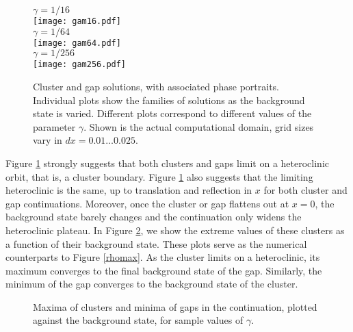 \documentclass[10pt]{article}
\begin{document}
\begin{figure}[h!]\begin{center}
$\gamma = 1/16$\\ 
\texttt{[image: gam16.pdf]}\\
$\gamma= 1/64$\\
\texttt{[image: gam64.pdf]}\\
$\gamma =1/256$\\
\texttt{[image: gam256.pdf]}\\
\end{center}
\caption{Cluster and gap solutions, with associated phase portraits. Individual plots show the families of solutions as the background state is varied. Different plots correspond to different values of the parameter $\gamma$. Shown is the actual computational domain, grid sizes vary in $dx=0.01\ldots 0.025$. }
\label{hom_conts}
\end{figure}

Figure \ref{hom_conts} strongly suggests that both clusters and gaps limit on a heteroclinic orbit, that is, a cluster boundary.  Figure \ref{hom_conts} also suggests that the limiting heteroclinic is the same, up to translation and reflection in $x$ for both cluster and gap continuations.   Moreover, once the cluster or gap flattens out at $x=0$, the background state barely changes and the continuation only widens the heteroclinic plateau.   In Figure  \ref{ext_v_bgst}, we show the extreme values of these clusters as a function of their background state.  These plots serve as the numerical counterparts to Figure \ref{rhomax}.  As the cluster limits on a heteroclinic, its maximum converges to the final background state of the gap.  Similarly, the minimum of the gap converges to the background state of the cluster.  

\begin{figure}[h!]
\caption{Maxima of clusters and minima of gaps in the continuation, plotted against the background state, for sample values of $\gamma$.}
\label{ext_v_bgst}
\end{figure}

\end{document}
